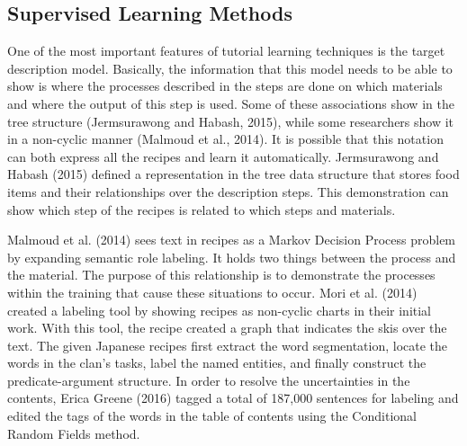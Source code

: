 \subsection{Supervised Learning Methods}
One of the most important features of tutorial learning techniques is the target description model. Basically, the information that this model needs to be able to show is where the processes described in the steps are done on which materials and where the output of this step is used. Some of these associations show in the tree structure (Jermsurawong and Habash, 2015), while some researchers show it in a non-cyclic manner (Malmoud et al., 2014). It is possible that this notation can both express all the recipes and learn it automatically.
Jermsurawong and Habash (2015) defined a representation in the tree data structure that stores food items and their relationships over the description steps. This demonstration can show which step of the recipes is related to which steps and materials.

Malmoud et al. (2014) sees text in recipes as a Markov Decision Process problem by expanding semantic role labeling. It holds two things between the process and the material. The purpose of this relationship is to demonstrate the processes within the training that cause these situations to occur.
Mori et al. (2014) created a labeling tool by showing recipes as non-cyclic charts in their initial work. With this tool, the recipe created a graph that indicates the skis over the text. The given Japanese recipes first extract the word segmentation, locate the words in the clan's tasks, label the named entities, and finally construct the predicate-argument structure.
In order to resolve the uncertainties in the contents, Erica Greene (2016) tagged a total of 187,000 sentences for labeling and edited the tags of the words in the table of contents using the Conditional Random Fields method.


